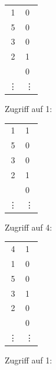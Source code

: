 \begin{enumerate}[a)]
\begin{solution}
\begin{minipage}{0.22\textwidth}
        \begin{tabular}{ | c | l}
        	\cline{1-1}
        	1      & 0      \\ \cline{1-1}
        	5      & 0      \\ \cline{1-1}
        	3      & 0      \\ \cline{1-1}
        	2      & 1      \\ \cline{1-1}
        	       & 0      \\ \cline{1-1}
        	\vdots & \vdots \\ \cline{1-1}
        \end{tabular}
    \end{minipage}
    \begin{minipage}{0.22\textwidth}
        \center
        Zugriff auf 1:

        \begin{tabular}{ | c | l}
        	\cline{1-1}
        	1      & 1      \\ \cline{1-1}
        	5      & 0      \\ \cline{1-1}
        	3      & 0      \\ \cline{1-1}
        	2      & 1      \\ \cline{1-1}
        	       & 0      \\ \cline{1-1}
        	\vdots & \vdots \\ \cline{1-1}
        \end{tabular}
    \end{minipage}
    \begin{minipage}{0.22\textwidth}
        \center
        Zugriff auf 4:

        \begin{tabular}{ | c | l}
        	\cline{1-1}
        	4      & 1      \\ \cline{1-1}
        	1      & 0      \\ \cline{1-1}
        	5      & 0      \\ \cline{1-1}
        	3      & 1      \\ \cline{1-1}
        	2      & 0      \\ \cline{1-1}
        	       & 0      \\ \cline{1-1}
        	\vdots & \vdots \\ \cline{1-1}
        \end{tabular}
    \end{minipage}

    \begin{minipage}{0.28\textwidth}
        \center
        Zugriff auf 1:


\end{minipage}
\end{solution}
\end{enumerate}

